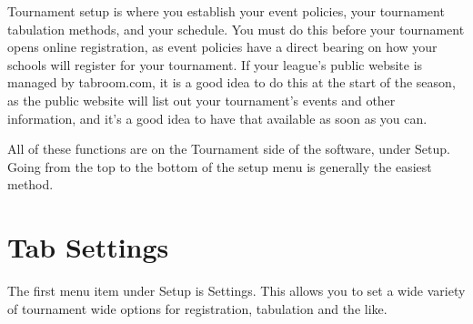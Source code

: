 \documentclass[12pt]{report} \usepackage {fullpage} \usepackage{times}
\begin{document}
Tournament setup is where you establish your event policies, your
tournament tabulation methods, and your schedule.   You must do this before
your tournament opens online registration, as event policies have a direct
bearing on how your schools will register for your tournament.   If your
league's public website is managed by tabroom.com, it is a good idea to do
this at the start of the season, as the public website will list out your
tournament's events and other information, and it's a good idea to have
that available as soon as you can. 

All of these functions are on the Tournament side of the software, under
Setup.  Going from the top to the bottom of the setup menu is generally the
easiest method.  
 	
\section{Tab Settings}

The first menu item under Setup is Settings.  This allows you to set a wide
variety of tournament wide options for registration, tabulation and the
like.   
\end{document}
